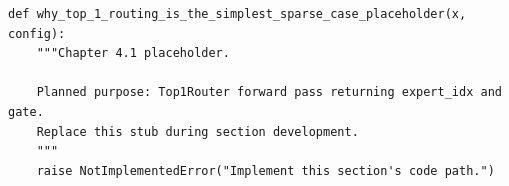 \begin{lstlisting}[style=bookpython,caption={Planned code placeholder for why top 1 routing is the simplest sparse case.},label={lst:ch04-why-top-1-routing-is-the-simplest-sparse-case}]
def why_top_1_routing_is_the_simplest_sparse_case_placeholder(x, config):
    """Chapter 4.1 placeholder.

    Planned purpose: Top1Router forward pass returning expert_idx and gate.
    Replace this stub during section development.
    """
    raise NotImplementedError("Implement this section's code path.")
\end{lstlisting}

